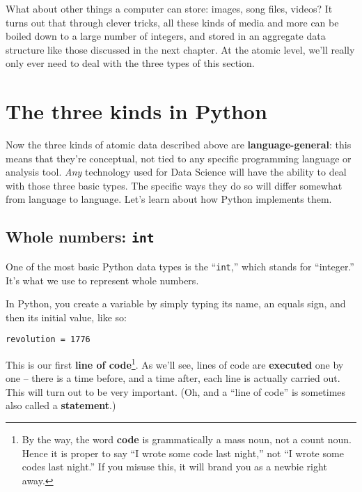 What about other things a computer can store: images, song files, videos? It
turns out that through clever tricks, all these kinds of media and more can be
boiled down to a large number of integers, and stored in an aggregate data
structure like those discussed in the next chapter. At the atomic level, we'll
really only ever need to deal with the three types of this section.

\section{The three kinds in Python}

Now the three kinds of atomic data described above are
\textbf{language-general}: this means that they're conceptual, not tied to any
specific programming language or analysis tool. \textit{Any} technology used
for Data Science will have the ability to deal with those three basic types.
The specific ways they do so will differ somewhat from language to language.
Let's learn about how Python implements them.

\subsection{Whole numbers: \texttt{int}}

One of the most basic Python data types is the ``\texttt{int},'' which stands
for ``integer.'' It's what we use to represent whole numbers.

In Python, you create a variable by simply typing its name, an equals sign, and
then its initial value, like so:

\begin{Verbatim}[fontsize=\small,samepage=true,frame=single,framesep=3mm]
revolution = 1776
\end{Verbatim}

This is our first \textbf{line of code}\footnote{By the way, the word
\textbf{code} is grammatically a mass noun, not a count noun. Hence it is
proper to say ``I wrote some code last night,'' not ``I wrote some codes last
night.'' If you misuse this, it will brand you as a newbie right away.}. As
we'll see, lines of code are \textbf{executed} one by one -- there is a time
before, and a time after, each line is actually carried out. This will turn out
to be very important. (Oh, and a ``line of code'' is sometimes also called a
\textbf{statement}.)


